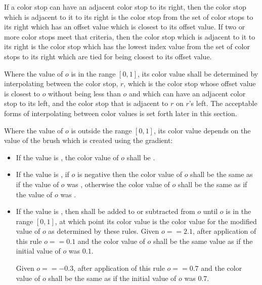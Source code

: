 \begin{enumeratea}
\item If a color stop can have an adjacent color stop to its right, then the color stop which is adjacent to it to its right is the color stop from the set of color stops to its right which has an offset value which is closest to its offset value. If two or more color stops meet that criteria, then the color stop which is adjacent to it to its right is the color stop which has the lowest index value from the set of color stops to its right which are tied for being closest to its offset value.

\item Where the value of $o$ is in the range $[0,1]$, its color value shall be determined by interpolating between the color stop, $r$, which is the color stop whose offset value is closest to $o$ without being less than $o$ and which can have an adjacent color stop to its left, and the color stop that is adjacent to $r$ on $r$'s left. The acceptable forms of interpolating between color values is set forth later in this section.

\item Where the value of $o$ is outside the range $[0,1]$, its color value depends on the  value of the brush which is created using the gradient:
	\begin{itemize}
	\item If the  value is , the color value of $o$ shall be .
	
	\item If the  value is , if $o$ is negative then the color value of $o$ shall be the same as if the value of $o$ was , otherwise the color value of $o$ shall be the same as if the value of $o$ was .
	
	\item If the  value is , then  shall be added to or subtracted from $o$ until $o$ is in the range $[0,1]$, at which point its color value is the color value for the modified value of $o$ as determined by these rules.
	\enterexample
	Given $o == 2.1$, after application of this rule $o == 0.1$ and the color value of $o$ shall be the same value as if the initial value of $o$ was $0.1$.
	
	Given $o == -0.3$, after application of this rule $o == 0.7$ and the color value of $o$ shall be the same as if the initial value of $o$ was $0.7$.
	\exitexample
	

\end{itemize}
\end{enumeratea}
